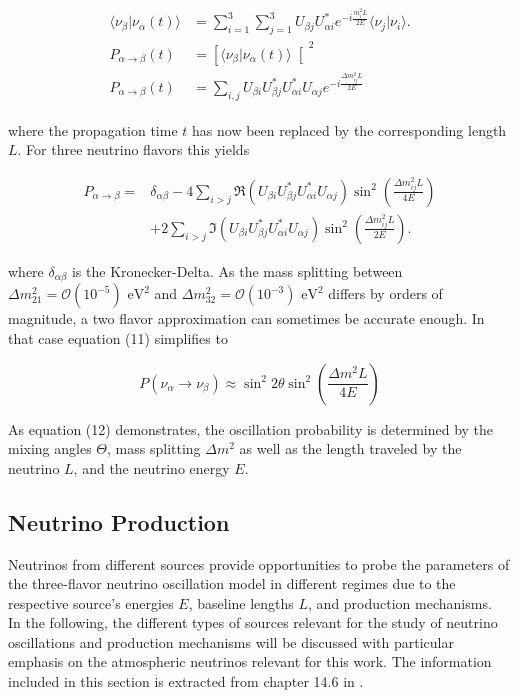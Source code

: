 \documentclass[a4paper,12pt,numbered]{article}
\begin{document}
\begin{align}
\begin{split}
\langle \nu_\beta | \nu_\alpha (t) \rangle &= \sum_{i=1}^3 \sum_{j=1}^3 U_{\beta j} U_{\alpha i}^* e^{-i \frac{m_i^2 L}{2E}} \langle \nu_j | \nu_i \rangle.
\\
P_{\alpha \to \beta}(t) &= \left[ \langle \nu_\beta | \nu_\alpha (t) \rangle \right[^2
\\
P_{\alpha \to \beta}(t) &= \sum_{i,j} U_{\beta i} U_{\beta j}^* U_{\alpha i}^* U_{\alpha j} e^{-i \frac{\Delta m_{ij}^2 L}{2E}}
\end{split}
\end{align}

where the propagation time $t$ has now been replaced by the corresponding length $L$.
For three neutrino flavors this yields

\begin{align}
P_{\alpha \to \beta} = & \delta_{\alpha\beta} - 4 \sum_{i > j} \Re\left( U_{\beta i} U_{\beta j}^* U_{\alpha i}^* U_{\alpha j} \right) \sin^2\left( \frac{\Delta m_{ij}^2 L}{4E} \right) \nonumber \\
& + 2 \sum_{i > j} \Im\left( U_{\beta i} U_{\beta j}^* U_{\alpha i}^* U_{\alpha j} \right) \sin^2\left( \frac{\Delta m_{ij}^2 L}{2E} \right).
\end{align}

where $\delta_{\alpha\beta}$ is the Kronecker-Delta. As the mass splitting between $\Delta m_{21}^2=\mathcal{O}(10^{-5}) \text{ eV}^2$ and $\Delta m_{32}^2=\mathcal{O}(10^{-3}) \text{ eV}^2$ differs by orders of magnitude, a two flavor approximation can sometimes be accurate enough. In that case equation (11) simplifies to

\begin{equation}
P(\nu_\alpha \to \nu_\beta) \approx \sin^2 2\theta \sin^2 \left(\frac{\Delta m^2 L}{4E}\right)
\end{equation}

As equation (12) demonstrates, the oscillation probability is determined by the mixing angles $\Theta$, mass splitting $\Delta m^2$ as well as the length traveled by the neutrino $L$, and the neutrino energy $E$. 

\subsection{Neutrino Production}

Neutrinos from different sources provide opportunities to probe the parameters of the three-flavor neutrino oscillation model in different regimes due to the respective source's energies $E$, baseline lengths $L$, and production mechanisms.
\\
In the following, the different types of sources relevant for the study of neutrino oscillations and production mechanisms will be discussed with particular emphasis on the atmospheric neutrinos relevant for this work. The information included in this section is extracted from chapter 14.6 in \cite{entire_pdg}.
\end{document}
